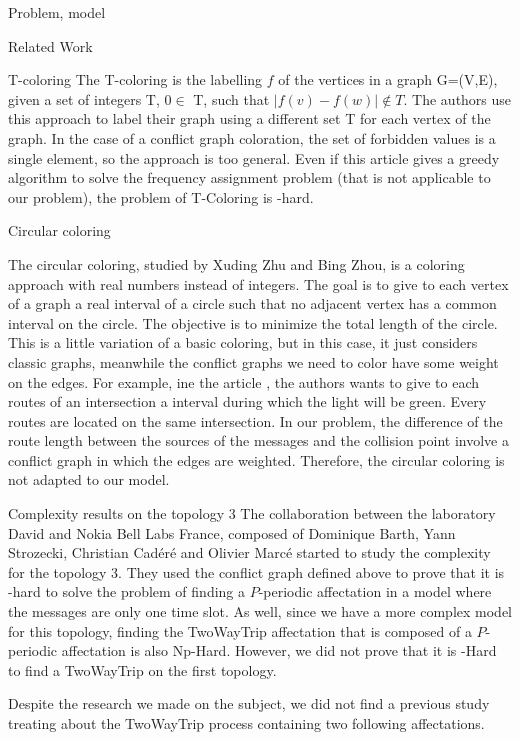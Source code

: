 \documentclass[a4paper,10pt]{report}
\begin{document}
\begin{chapter}{Problem, model}
\begin{section}{Related Work}
\begin{subsection}{T-coloring}
 The T-coloring is the labelling $f$ of the vertices in a graph G=(V,E), given a set of integers T, $0 \in$ T, such that 
 $|f(v) - f(w)| \notin T$.
 The authors use this approach to label their graph using a different set T for each vertex of the graph.
 In the case of a conflict graph coloration, the set of forbidden values is a single element, so the approach is too general.
 Even if this article gives a greedy algorithm to solve the frequency assignment problem (that is not applicable to our problem), the problem of T-Coloring is \NP-hard.

\end{subsection}
\begin{subsection}{Circular coloring}

 The circular coloring, studied by Xuding Zhu\cite{zhu2006recent}\cite{zhu2001circular} and Bing Zhou\cite{zhou2013multiple},
 is a coloring approach with real numbers instead of integers. The goal is to give to each vertex of a graph 
 a real interval of a circle such that no adjacent vertex has a common interval on the circle. The objective is to minimize the total length of the circle. This is a little variation of a
 basic coloring, but in this case, it just considers classic graphs, meanwhile the conflict graphs we need to color have some weight
 on the edges.
 For example, ine the article \cite{zhu2001circular}, the authors wants to give to each routes of an intersection a interval during which the light will be green. Every routes are located on the same intersection. In our problem, the difference of the route length between the sources of the messages and the collision point involve a conflict graph in which the edges are weighted.
 Therefore, the circular coloring is not adapted to our model.

\end{subsection}

\begin{subsection}{Complexity results on the topology 3}
 The collaboration between the laboratory David and Nokia Bell Labs France, composed of Dominique Barth, Yann Strozecki, Christian Cadéré and Olivier Marcé started to study the complexity for the topology 3.
 They used the conflict graph defined above to prove that it is \NP-hard to solve the problem of finding a $P$-periodic affectation in a model where the
 messages are only one time slot. As well, since we have a more complex model for this topology, finding the TwoWayTrip affectation
 that is composed of a $P$-periodic affectation is also Np-Hard. However, we did not prove that it is \NP-Hard to find
 a TwoWayTrip on the first topology.
\end{subsection}

 \end{section}

Despite the research we made on the subject, we did not find a previous study treating about the TwoWayTrip process containing two 
following affectations.
\end{chapter}
\end{document}

